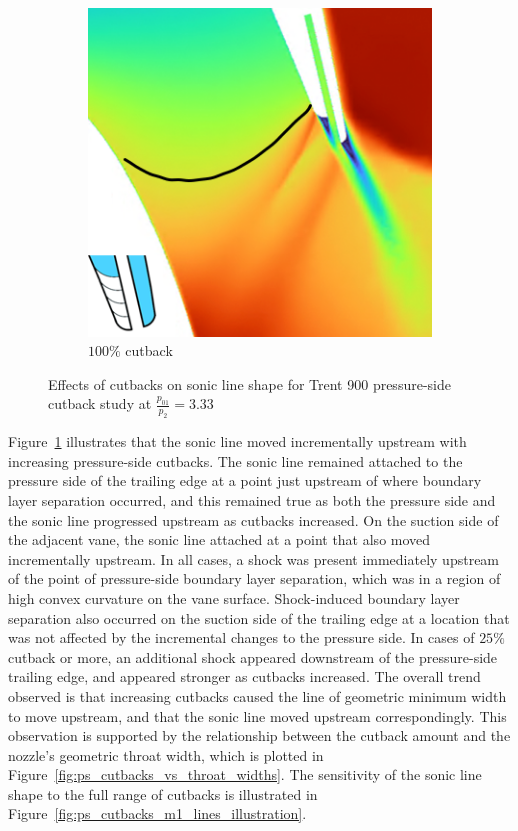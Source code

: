 \documentclass[a4paper, 11pt, oneside]{report}
\begin{document}
\begin{figure}[H]
\begin{subfigure}{.15\textwidth}
	\end{subfigure}
	\begin{subfigure}{.42\textwidth}
		\centering
		\includegraphics[width=\linewidth]{figs/ps_cutbacks_choked_100.png}
		\caption{$100\%$ cutback}
	\end{subfigure}
	\caption{Effects of cutbacks on sonic line shape for Trent 900 pressure-side cutback study at $\frac{p_{01}}{p_2}=3.33$}
	\label{fig:ps_cutbacks_choked}
\end{figure}

Figure~\ref{fig:ps_cutbacks_choked} illustrates that the sonic line moved incrementally upstream with increasing pressure-side cutbacks. The sonic line remained attached to the pressure side of the trailing edge at a point just upstream of where boundary layer separation occurred, and this remained true as both the pressure side and the sonic line progressed upstream as cutbacks increased. On the suction side of the adjacent vane, the sonic line attached at a point that also moved incrementally upstream. In all cases, a shock was present immediately upstream of the point of pressure-side boundary layer separation, which was in a region of high convex curvature on the vane surface. Shock-induced boundary layer separation also occurred on the suction side of the trailing edge at a location that was not affected by the incremental changes to the pressure side. In cases of $25\%$ cutback or more, an additional shock appeared downstream of the pressure-side trailing edge, and appeared stronger as cutbacks increased. The overall trend observed is that increasing cutbacks caused the line of geometric minimum width to move upstream, and that the sonic line moved upstream correspondingly. This observation is supported by the relationship between the cutback amount and the nozzle's geometric throat width, which is plotted in Figure~\ref{fig:ps_cutbacks_vs_throat_widths}. The sensitivity of the sonic line shape to the full range of cutbacks is illustrated in Figure~\ref{fig:ps_cutbacks_m1_lines_illustration}.
\end{document}
